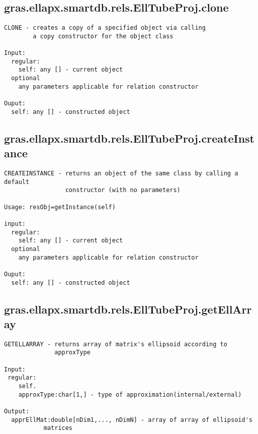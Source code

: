 \subsection{\texorpdfstring{gras.ellapx.smartdb.rels.EllTubeProj.clone}{clone}}\label{method:gras.ellapx.smartdb.rels.EllTubeProj.clone}
\begin{verbatim}
CLONE - creates a copy of a specified object via calling
        a copy constructor for the object class

Input:
  regular:
    self: any [] - current object
  optional
    any parameters applicable for relation constructor

Ouput:
  self: any [] - constructed object
\end{verbatim}
\subsection{\texorpdfstring{gras.ellapx.smartdb.rels.EllTubeProj.createInstance}{createInstance}}\label{method:gras.ellapx.smartdb.rels.EllTubeProj.createInstance}
\begin{verbatim}
CREATEINSTANCE - returns an object of the same class by calling a default
                 constructor (with no parameters)

Usage: resObj=getInstance(self)

input:
  regular:
    self: any [] - current object
  optional
    any parameters applicable for relation constructor

Ouput:
  self: any [] - constructed object
\end{verbatim}
\subsection{\texorpdfstring{gras.ellapx.smartdb.rels.EllTubeProj.getEllArray}{getEllArray}}\label{method:gras.ellapx.smartdb.rels.EllTubeProj.getEllArray}
\begin{verbatim}
GETELLARRAY - returns array of matrix's ellipsoid according to
              approxType

Input:
 regular:
    self.
    approxType:char[1,] - type of approximation(internal/external)

Output:
  apprEllMat:double[nDim1,..., nDimN] - array of array of ellipsoid's
           matrices
\end{verbatim}
